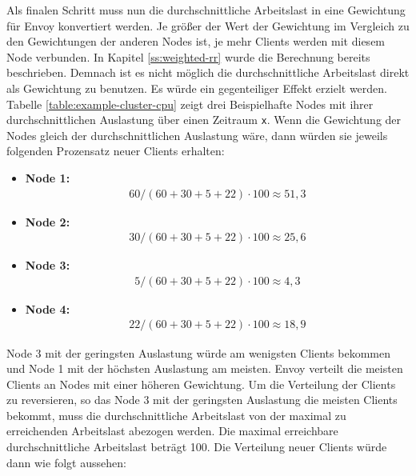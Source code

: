 Als finalen Schritt muss nun die durchschnittliche Arbeitslast in eine Gewichtung für Envoy konvertiert werden. Je grö{\ss}er der Wert der Gewichtung im Vergleich zu den Gewichtungen der anderen Nodes ist, je mehr Clients werden mit diesem Node verbunden. In Kapitel \ref{ss:weighted-rr} wurde die Berechnung bereits beschrieben. Demnach ist es nicht möglich die durchschnittliche Arbeitslast direkt als Gewichtung zu benutzen. Es würde ein gegenteiliger Effekt erzielt werden.
Tabelle \ref{table:example-cluster-cpu} zeigt drei Beispielhafte Nodes mit ihrer durchschnittlichen Auslastung über einen Zeitraum \verb|x|. Wenn die Gewichtung der Nodes gleich der durchschnittlichen Auslastung wäre, dann würden sie jeweils folgenden Prozensatz neuer Clients erhalten:
\begin{itemize}
  \item \textbf{Node 1:}
    \begin{align}
      60 / (60 + 30 + 5 + 22) \cdot 100 \approx 51,3
    \end{align}
  \item \textbf{Node 2:}
    \begin{align}
      30 / (60 + 30 + 5 + 22) \cdot 100 \approx 25,6
    \end{align}
  \item \textbf{Node 3:}
    \begin{align}
      5 / (60 + 30 + 5 + 22) \cdot 100 \approx 4,3
    \end{align}
  \item \textbf{Node 4:}
    \begin{align}
      22 / (60 + 30 + 5 + 22) \cdot 100 \approx 18,9
    \end{align}
\end{itemize}
Node 3 mit der geringsten Auslastung würde am wenigsten Clients bekommen und Node 1 mit der höchsten Auslastung am meisten. Envoy verteilt die meisten Clients an Nodes mit einer höheren Gewichtung.
Um die Verteilung der Clients zu reversieren, so das Node 3 mit der geringsten Auslastung die meisten Clients bekommt, muss die durchschnittliche Arbeitslast von der maximal zu erreichenden Arbeitslast abezogen werden. Die maximal erreichbare durchschnittliche Arbeitslast beträgt 100. Die Verteilung neuer Clients würde dann wie folgt aussehen:
